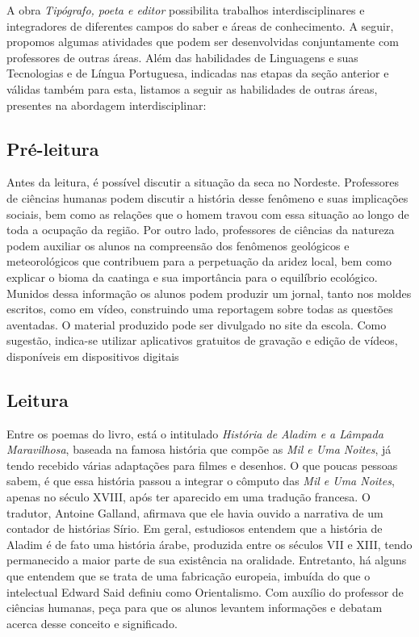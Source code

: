 \documentclass[12pt]{extarticle}
\begin{document}
A obra \emph{Tipógrafo, poeta e editor} possibilita trabalhos
interdisciplinares e integradores de diferentes campos do saber e áreas
de conhecimento. A seguir, propomos algumas atividades que podem ser
desenvolvidas conjuntamente com professores de outras áreas. Além das
habilidades de Linguagens e suas Tecnologias e de Língua Portuguesa,
indicadas nas etapas da seção anterior e válidas também para esta,
listamos a seguir as habilidades de outras áreas, presentes na abordagem
interdisciplinar:

\subsection{Pré-leitura}

Antes da leitura, é possível discutir a situação da seca no
Nordeste. Professores de ciências humanas podem discutir a história
desse fenômeno e suas implicações sociais, bem como as relações que o
homem travou com essa situação ao longo de toda a ocupação da região.
Por outro lado, professores de ciências da natureza podem auxiliar os
alunos na compreensão dos fenômenos geológicos e meteorológicos que
contribuem para a perpetuação da aridez local, bem como explicar o bioma
da caatinga e sua importância para o equilíbrio ecológico. Munidos dessa
informação os alunos podem produzir um jornal, tanto nos moldes
escritos, como em vídeo, construindo uma reportagem sobre todas as
questões aventadas. O material produzido pode ser divulgado no site da
escola. Como sugestão, indica-se utilizar aplicativos gratuitos de
gravação e edição de vídeos, disponíveis em dispositivos digitais

\subsection{Leitura}

Entre os poemas do livro, está o intitulado \emph{História
de Aladim e a Lâmpada Maravilhosa}, baseada na famosa história que
compõe as \emph{Mil e Uma Noites}, já tendo recebido várias adaptações
para filmes e desenhos. O que poucas pessoas sabem, é que essa história
passou a integrar o cômputo das \emph{Mil e Uma Noites}, apenas no
século XVIII, após ter aparecido em uma tradução francesa. O tradutor,
Antoine Galland, afirmava que ele havia ouvido a narrativa de um
contador de histórias Sírio. Em geral, estudiosos entendem que a
história de Aladim é de fato uma história árabe, produzida entre os
séculos VII e XIII, tendo permanecido a maior parte de sua existência na
oralidade. Entretanto, há alguns que entendem que se trata de uma
fabricação europeia, imbuída do que o intelectual Edward Said definiu
como Orientalismo. Com auxílio do professor de ciências humanas, peça
para que os alunos levantem informações e debatam acerca desse conceito
e significado.
\end{document}
